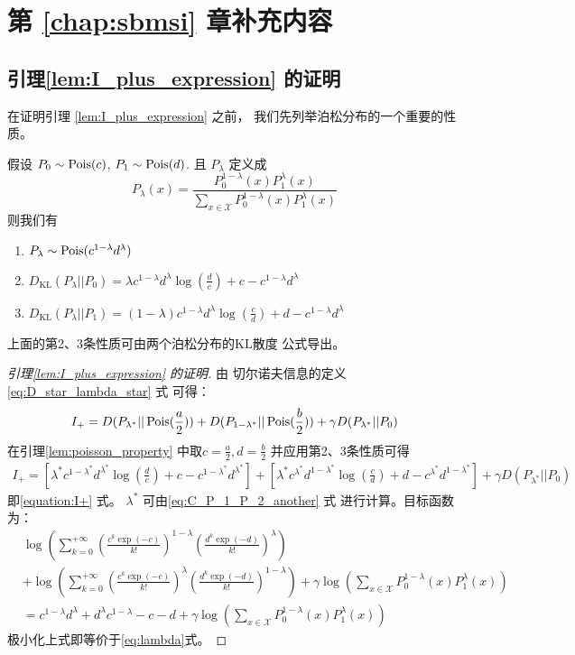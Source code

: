 \chapter{第 \ref{chap:sbmsi} 章补充内容}
\section{引理\ref{lem:I_plus_expression} 的证明}
在证明引理
\ref{lem:I_plus_expression}  之前，
我们先列举泊松分布的一个重要的性质。
\begin{lemma}\label{lem:poisson_property}
假设 $P_0 \sim \operatorname{Pois}(c)$, $P_1 \sim \operatorname{Pois}(d)$.
且 $P_{\lambda}$ 定义成
$$
P_{\lambda}(x) = \frac{P_0^{1-\lambda}(x) P_1^{\lambda} (x)}
{\sum_{x \in \mathcal{X}}P_0^{1-\lambda}(x) P_1^{\lambda} (x)}
$$
则我们有
\begin{enumerate}
    \item $P_{\lambda} \sim \operatorname{Pois}(c^{1-\lambda} d^{\lambda})$
    \item $D_{\mathrm{KL}}(P_{\lambda}||P_0) = 
    \lambda c^{1-\lambda}d^{\lambda}\log(\frac{d}{c}) + c-c^{1-\lambda}d^{\lambda}$
    \item $D_{\mathrm{KL}}(P_{\lambda}||P_1) = (1-\lambda)
    c^{1-\lambda}d^{\lambda}\log(\frac{c}{d})
    + d-c^{1-\lambda}d^{\lambda}$
\end{enumerate}
\end{lemma}
上面的第2、3条性质可由两个泊松分布的KL散度
公式导出。
\begin{proof}[引理\ref{lem:I_plus_expression} 的证明]
由 切尔诺夫信息的定义 \eqref{eq:D_star_lambda_star} 式
可得：
$$
I_+ = D(P_{\lambda^*} || \operatorname{Pois}(\frac{a}{2}))
+ D(P_{1-\lambda^*} || \operatorname{Pois}(\frac{b}{2}))
+ \gamma D(P_{\lambda^*} || P_0)
$$
在引理\ref{lem:poisson_property}
中取$c=\frac{a}{2}, d=\frac{b}{2}$
并应用第2、3条性质可得
\begin{align*}
    I_+ = \left[\lambda^* c^{1-\lambda^*}d^{\lambda^*}
    \log(\frac{d}{c})+ c-c^{1-\lambda^*}d^{\lambda^*}
    \right]
+ \left[\lambda^* c^{\lambda^*}d^{1-\lambda^*}\log(\frac{c}{d})
+ d - c^{\lambda^*}d^{1-\lambda^*}\right]
+ \gamma D(P_{\lambda^*} || P_0)
\end{align*}
即\eqref{equation:I+} 式。
$\lambda^*$ 可由\eqref{eq:C_P_1_P_2_another} 式
进行计算。目标函数为：
\begin{align*}
&\log\left(\sum_{k=0}^{+\infty} \left(\frac{c^k\exp(-c)}{k!}
\right)^{1-\lambda}
\left(\frac{d^k\exp(-d)}{k!} \right)^{\lambda}
\right) \\
& + \log\left(\sum_{k=0}^{+\infty} \left(\frac{c^k\exp(-c)}{k!}
\right)^{\lambda}
\left(\frac{d^k\exp(-d)}{k!} \right)^{1-\lambda}
\right)+
\gamma\log(\sum_{x\in \mathcal{X}}P^{1-\lambda}_0(x) P^{\lambda}_1(x)
)\\
& = c^{1-\lambda} d^{\lambda} 
+ d^{\lambda} c^{1-\lambda} -c -d +
\gamma\log(\sum_{x\in \mathcal{X}}P^{1-\lambda}_0(x) P^{\lambda}_1(x)
)
\end{align*}
极小化上式即等价于\eqref{eq:lambda}式。
\end{proof}
